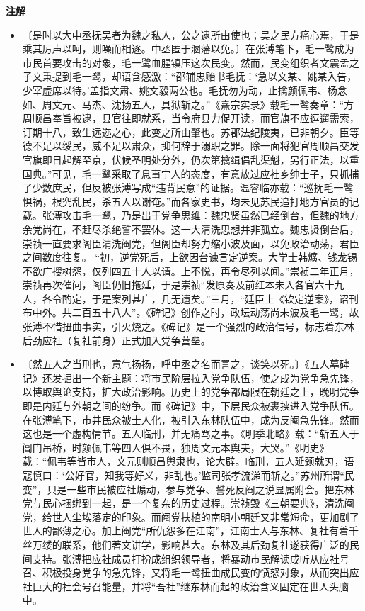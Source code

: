 \documentclass[12pt,UTF-8,openany,a4]{ctexbook}
\begin{document}
\newpage

\begin{Large}
    \noindent\textbf{注解}
\end{Large}


\vspace{-1em}

\begin{itemize}
    \setlength\itemsep{-0.2em}
    \item〔是时以大中丞抚吴者为魏之私人，公之逮所由使也；吴之民方痛心焉，于是乘其厉声以呵，则噪而相逐。中丞匿于溷藩以免。〕{\yiwen 在张溥笔下，毛一鹭成为市民首要攻击的对象，毛一鹭血腥镇压这次民变。然而，民变组织者文震孟之子文秉提到毛一鹭，却语含感激：“邵辅忠贻书毛抚：‘急以文某、姚某入告，少宰虚席以待。’盖指文肃、姚文毅两公也。毛抚勿为动，止擒颜佩韦、杨念如、周文元、马杰、沈扬五人，具狱斩之。”《熹宗实录》载毛一鹭奏章：“方周顺昌奉旨被逮，县官往即就系，当令府县力促开读，而官旗不应逗遛需索，订期十八，致生远迩之心，此变之所由肇也。苏郡法纪陵夷，已非朝夕。臣等德不足以绥民，威不足以肃众，抑何辞于溺职之罪。除一面将犯官周顺昌交发官旗即日起解至京，伏候圣明处分外，仍次第擒缉倡乱渠魁，另行正法，以重国典。”可见，毛一鹭采取了息事宁人的态度，有意放过应社乡绅士子，只抓捕了少数庶民，但反被张溥写成“违背民意”的证据。温睿临亦载：“巡抚毛一鹭惧祸，根究乱民，杀五人以谢奄。”而各家史书，均未见苏民追打地方官员的记载。张溥攻击毛一鹭，乃是出于党争思维：魏忠贤虽然已经倒台，但魏的地方余党尚在，不赶尽杀绝誓不罢休。这一大清洗思想并非孤立。魏忠贤倒台后，崇祯一直要求阁臣清洗阉党，但阁臣却努力缩小波及面，以免政治动荡，君臣之间数度往复。 “初，逆党死后，上欲因台谏言定逆案。大学士韩爌、钱龙锡不欲广搜树怨，仅列四五十人以请。上不悦，再令尽列以闻。”崇祯二年正月，崇祯再次催问，阁臣仍旧拖延，于是崇祯“发原奏及前红本未入各官六十九人，各令酌定，于是案列甚广，几无遗矣。”三月，“廷臣上《钦定逆案》，诏刊布中外。共二百五十八人”。《碑记》创作之时，政坛动荡尚未波及毛一鹭，故张溥不惜扭曲事实，引火烧之。《碑记》是一个强烈的政治信号，标志着东林后劲应社（复社前身）正式加入党争营垒。}
    \item〔然五人之当刑也，意气扬扬，呼中丞之名而詈之，谈笑以死。〕{\yiwen 《五人墓碑记》还发掘出一个新主题：将市民阶层拉入党争队伍，使之成为党争急先锋，以博取舆论支持，扩大政治影响。历史上的党争都局限在朝廷之上，晚明党争即是内廷与外朝之间的纷争。而《碑记》中，下层民众被裹挟进入党争队伍。在张溥笔下，市井民众被士人化，被引入东林队伍中，成为反阉急先锋。然而这也是一个虚构情节。五人临刑，并无痛骂之事。《明季北略》载：“斩五人于阊门吊桥，时颜佩韦等四人俱不畏，独周文元本舆夫，大哭。”《明史》载：“佩韦等皆市人，文元则顺昌舆隶也，论大辟。临刑，五人延颈就刃，语寇慎曰：‘公好官，知我等好义，非乱也。’监司张孝流涕而斩之。”苏州所谓“民变”，只是一些市民被应社煽动，参与党争、誓死反阉之说显属附会。把东林党与民心捆绑到一起，是一个复杂的历史过程。崇祯毁《三朝要典》，清洗阉党，给世人尘埃落定的印象。而阉党扶植的南明小朝廷又非常短命，更加剧了世人的鄙薄之心。加上阉党“所仇怨多在江南”，江南士人与东林、复社有着千丝万缕的联系，他们著文讲学，影响甚大。东林及其后劲复社遂获得广泛的民间支持。张溥把应社成员打扮成组织领导者，将暴动市民解读成听从应社号召、积极投身党争的急先锋，又将毛一鹭扭曲成民变的愤怒对象，从而突出应社巨大的社会号召能量，并将“吾社”继东林而起的政治含义固定在世人头脑中。}
\end{itemize}
\end{document}
